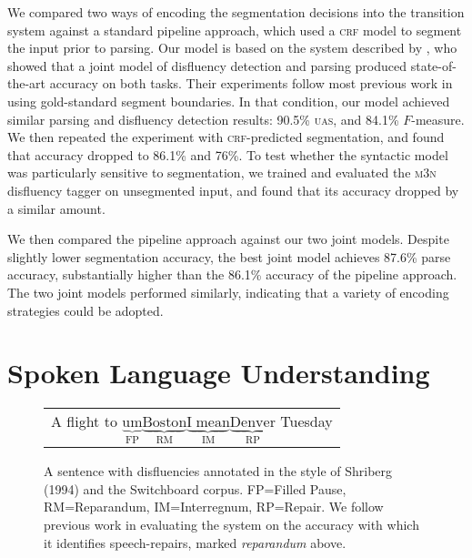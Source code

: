 \documentclass[11pt,letterpaper]{article}
\begin{document}
We compared two ways of encoding the segmentation decisions into the transition
system against a standard pipeline approach, which used a \textsc{crf} model
to segment the input prior to parsing.  Our model is based on the system described
by \citet{honnibal:14}, who showed that a joint model of disfluency detection
and parsing produced state-of-the-art accuracy on both tasks.
Their experiments follow most previous work in using gold-standard segment boundaries.
In that condition, our model achieved similar parsing and disfluency
detection results: 90.5\% \textsc{uas}, and 84.1\% $F$-measure.
We then repeated the experiment with \textsc{crf}-predicted segmentation,
and found that accuracy dropped to 86.1\% and 76\%.
To test whether the syntactic model was particularly sensitive to segmentation,
we trained and evaluated the \citet{qian:13} \textsc{m3n} disfluency tagger on
unsegmented input, and found that its accuracy dropped by a similar amount.

We then compared the pipeline approach against our two joint models.
Despite slightly lower segmentation accuracy,
the best joint
model achieves 87.6\% parse accuracy, substantially higher than the 86.1\%
accuracy of the pipeline approach.
The two joint models performed similarly, indicating that a variety of encoding
strategies could be adopted.


\section{Spoken Language Understanding}

\begin{figure}
    \begin{tabular}{l}

        A flight to $\underbrace{\mathrm{um}}_\text{FP} \underbrace{\mathrm{Boston}}_\text{RM} \underbrace{\mathrm{I\;mean}}_\text{IM} \underbrace{\mathrm{Denver}}_\text{RP}$ Tuesday\\

\end{tabular}
\caption{\small A sentence with disfluencies annotated in the style of Shriberg (1994) 
    and the Switchboard corpus.
FP=Filled Pause, RM=Reparandum, IM=Interregnum, RP=Repair.
We follow previous work in evaluating the system on the accuracy with which
it identifies speech-repairs, marked \emph{reparandum} above.
\label{fig:shriberg}}
\end{figure}


\end{document}
